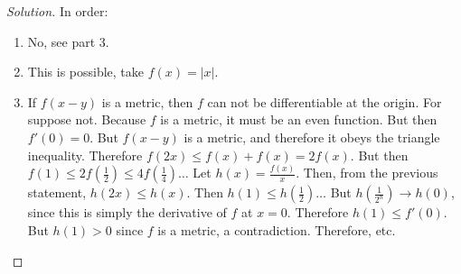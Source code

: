 \documentclass[crop=false,class=article,oneside]{standalone}
\begin{document}
        \begin{proof}[Solution]
            In order:
            \begin{enumerate}
                \item No, see part 3.
                \item This is possible, take $f(x)=|x|$.
                \item If $f(x-y)$ is a metric, then
                      $f$ can not be differentiable
                      at the origin. For suppose not.
                      Because $f$ is a metric, it
                      must be an even function. But
                      then $f'(0)=0$. But $f(x-y)$ is
                      a metric, and therefore it obeys
                      the triangle inequality. Therefore
                      $f(2x)\leq{f(x)+f(x)}=2f(x)$. But then
                      $f(1)\leq{2f(\frac{1}{2})}%
                       \leq{4f(\frac{1}{4})}\hdots$
                      Let $h(x)=\frac{f(x)}{x}$. Then, from
                      the previous statement, $h(2x)\leq{h(x)}$.
                      Then $h(1)\leq{h(\frac{1}{2})}\hdots$
                      But $h(\frac{1}{2^{n}})\rightarrow{h(0)}$,
                      since this is simply the derivative of
                      $f$ at $x=0$. Therefore
                      $h(1)\leq{f'(0)}$. But $h(1)>0$ since
                      $f$ is a metric, a contradiction.
                      Therefore, etc.
            \end{enumerate}
        \end{proof}
\end{document}
